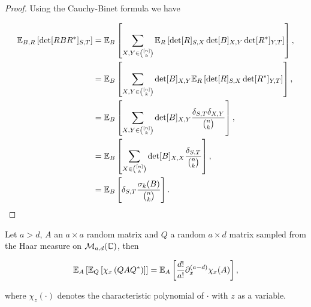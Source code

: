 \begin{proof}
    Using the Cauchy-Binet formula we have

    \begin{align*}
        \mathbb E_{B,R} \left[ \det[RBR^*]_{S,T} \right] &= \mathbb E_B \left[\sum_{X,Y \in \binom{[n]}{k}} \mathbb E_R \left[ \det[R]_{S,X} \det[B]_{X,Y} \det[R^*]_{Y,T} \right] \right],\\ 
        &= \mathbb E_B \left[\sum_{X,Y \in \binom{[n]}{k}} \det[B]_{X,Y} \mathbb E_R \left[ \det[R]_{S,X} \det[R^*]_{Y,T} \right] \right],\\ 
        &= \mathbb E_B \left[\sum_{X,Y \in \binom{[n]}{k}} \det[B]_{X,Y} \frac{\delta_{S,T} \delta_{X,Y}}{\binom{n}{k}} \right],\\ 
        &= \mathbb E_B \left[\sum_{X \in \binom{[n]}{k}} \det [B]_{X,X} \frac{\delta_{S,T}}{\binom{n}{k}} \right],\\
        &= \mathbb E_B \left[\delta_{S,T} \frac{\sigma_k(B)}{\binom{n}k}\right].
    \end{align*}
\end{proof}


\begin{lemma}
    Let $a > d$, $A$ an $a \times a$ random matrix and $Q$ a random $a \times d$ matrix sampled from the Haar measure on $\mathcal M_{a,d}(\mathbb C)$, then

    \begin{equation*}
        \mathbb E_A \left[ \mathbb E_Q\left[ \chi_x \left( Q A Q^* \right) \right]\right] = \mathbb E_A \left[\frac{d!}{a!} \partial_x^{(a-d)} \chi_x(A) \right],
    \end{equation*}

    \noindent where $\chi_z(\cdot)$ denotes the characteristic polynomial of $\cdot$ with $z$ as a variable.
\end{lemma}

